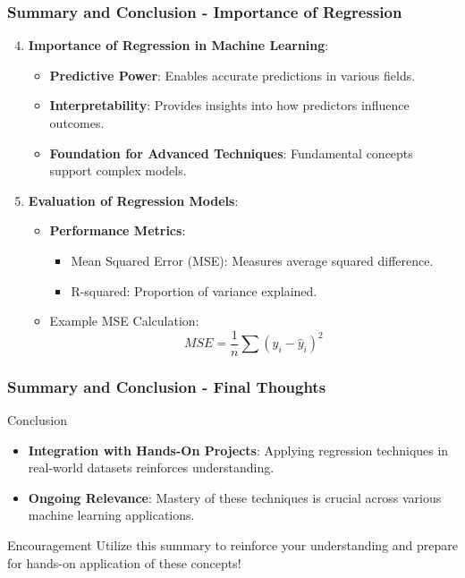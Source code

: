 \documentclass[aspectratio=169]{beamer}
\begin{document}
\begin{frame}[fragile]
    \frametitle{Summary and Conclusion - Importance of Regression}
    \begin{enumerate}
        \setcounter{enumi}{3}
        \item \textbf{Importance of Regression in Machine Learning}:
        \begin{itemize}
            \item \textbf{Predictive Power}: Enables accurate predictions in various fields.
            \item \textbf{Interpretability}: Provides insights into how predictors influence outcomes.
            \item \textbf{Foundation for Advanced Techniques}: Fundamental concepts support complex models.
        \end{itemize}

        \item \textbf{Evaluation of Regression Models}:
        \begin{itemize}
            \item \textbf{Performance Metrics}:
            \begin{itemize}
                \item Mean Squared Error (MSE): Measures average squared difference.
                \item R-squared: Proportion of variance explained.
                \end{itemize}
            \item Example MSE Calculation:
            \begin{equation}
                MSE = \frac{1}{n} \sum (y_i - \hat{y}_i)^2
            \end{equation}
        \end{itemize}
    \end{enumerate}
\end{frame}

\begin{frame}[fragile]
    \frametitle{Summary and Conclusion - Final Thoughts}
    \begin{block}{Conclusion}
        \begin{itemize}
            \item \textbf{Integration with Hands-On Projects}: Applying regression techniques in real-world datasets reinforces understanding.
            \item \textbf{Ongoing Relevance}: Mastery of these techniques is crucial across various machine learning applications.
        \end{itemize}
    \end{block}

    \begin{block}{Encouragement}
        Utilize this summary to reinforce your understanding and prepare for hands-on application of these concepts!
    \end{block}
\end{frame}
\end{document}
